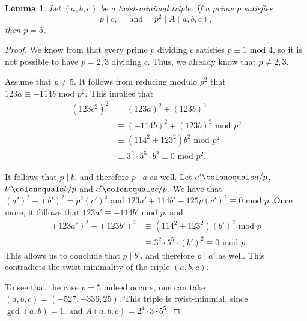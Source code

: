 \documentclass[12pt]{amsart}
\newcounter{counter}[section] %
\numberwithin{equation}{section} %
\newtheorem{lemma}[counter]{Lemma}
\theoremstyle{definition} \newtheorem{definition}[counter]{Definition}
\theoremstyle{remark} \newtheorem{nonexam}[counter]{Non-example}
\newcommand{\md}{\text{ mod }} %
\newcommand{\mand}{\text{ and }} %
\begin{document}
\begin{lemma}
  \label{lemma:p-mid-c-and-pp-mid-A}
  Let $(a,b,c)$ be a twist-minimal triple. If a prime $p$ satisfies
  \begin{equation*}
    p \mid c,\quad \mand \quad p^2 \mid A(a,b,c),
  \end{equation*}
  then $p=5$.
\end{lemma}
\begin{proof}
  We know from  that every prime $p$ dividing $c$
  satisfies $p \equiv 1 \md 4$, so it is not possible to have $p = 2,3$
  dividing $c$. Thus, we already know that $p \neq 2,3$.

  Assume that $p \neq 5$. It follows from reducing  modulo $p^2$
  that $123a \equiv -114b \md p^2$. This implies that
  \begin{align*}
    (123c^2)^2 &= (123a)^2 + (123b)^2 \\
               &\equiv (-114b)^2 + (123b)^2 \md p^2 \\
               &\equiv (114^2 + 123^2)b^2 \md p^2 \\
               &\equiv 3^2\cdot 5^5\cdot b^2 \equiv 0 \md p^2 .
  \end{align*}

It follows that $p \mid b$, and therefore $p \mid a$ as well. Let $a'
\colonequals a/p$, $b' \colonequals b/p$ and $c'\colonequals c/p$. We have that
$(a')^2 + (b')^2 = p^2(c')^4$ and $123a' + 114b' + 125p(c')^2 \equiv 0 \md p$.
Once more, it follows that $123a' \equiv -114b' \md p$, and
  \begin{align*}
    (123a')^2 + (123b')^2 &\equiv (114^2 + 123^2)(b')^2 \md p \\
                       &\equiv 3^2\cdot 5^5\cdot (b')^2 \equiv 0 \md p .
  \end{align*}
  This allows us to conclude that $p \mid b'$, and therefore $p \mid a'$ as well. This contradicts the
  twist-minimality of the triple $(a,b,c)$.

  To see that the case $p=5$ indeed occurs, one can take $(a,b,c) = (-527,
  -336, 25)$. This triple is twist-minimal, since $\gcd(a,b)=1$, and $A(a,b,c)
  = 2^4\cdot 3 \cdot 5^5$.
\end{proof}
\end{document}
